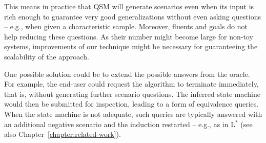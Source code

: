 \begin{itemize}
This means in practice that QSM will generate scenarios even when its input is rich enough to guarantee very good generalizations without even asking questions -- e.g., when given a characteristic sample. Moreover, fluents and goals do not help reducing these questions. As their number might become large for non-toy systems, improvements of our technique might be necessary for guaranteeing the scalability of the approach. 

One possible solution could be to extend the possible answers from the oracle. For example, the end-user could request the algorithm to terminate immediately, that is, without generating further scenario questions. The inferred state machine would then be submitted for inspection, leading to a form of equivalence queries. When the state machine is not adequate, such queries are typically answered with an additional negative scenario and the induction restarted -- e.g., as in L$^*$ \cite{Angluin:1987} (see also Chapter~\ref{chapter:related-work}).

\end{itemize}

